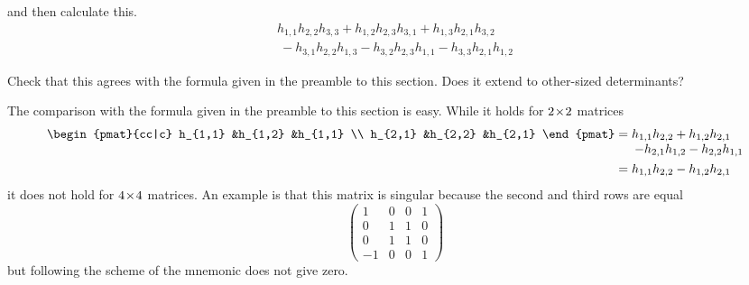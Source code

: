 \begin{exercises}
\begin{equation*}
     \end{equation*}
     and then calculate this.
     \begin{equation*}
      \begin{array}{l}
      h_{1,1}h_{2,2}h_{3,3}+h_{1,2}h_{2,3}h_{3,1}+h_{1,3}h_{2,1}h_{3,2} \\
      \>-h_{3,1}h_{2,2}h_{1,3}-h_{3,2}h_{2,3}h_{1,1}
        -h_{3,3}h_{2,1}h_{1,2}
      \end{array}
    \end{equation*}
    \begin{exparts}
      \partsitem Check that this agrees with the formula given in the 
        preamble to this section.
      \partsitem Does it extend to other-sized determinants?
    \end{exparts}
    \begin{answer}
      \begin{exparts}
        \partsitem The comparison with the formula given in the preamble to
          this section is easy.
        \partsitem While it holds for \( 2 \! \times \! 2 \) matrices
          \begin{align*}
            \begin{pmat}{cc|c}
              h_{1,1} &h_{1,2} &h_{1,1} \\
              h_{2,1} &h_{2,2} &h_{2,1}
            \end{pmat}
            &=\begin{array}[t]{@{}l@{}}
              h_{1,1}h_{2,2}+h_{1,2}h_{2,1}  \\
              \>-h_{2,1}h_{1,2}-h_{2,2}h_{1,1}
            \end{array}                                     \\
            &=h_{1,1}h_{2,2}-h_{1,2}h_{2,1}
          \end{align*}
          it does not hold for \( 4 \! \times \! 4 \) matrices.
          An example is that this matrix is
          singular because the second and third rows are equal 
          \begin{equation*}
            \begin{pmatrix}  
              1  &0  &0  &1   \\
              0  &1  &1  &0   \\
              0  &1  &1  &0   \\
             -1  &0  &0  &1  
            \end{pmatrix}
          \end{equation*}
          but following the scheme of the mnemonic does not give zero.

\end{exparts}
\end{answer}
\end{exercises}
